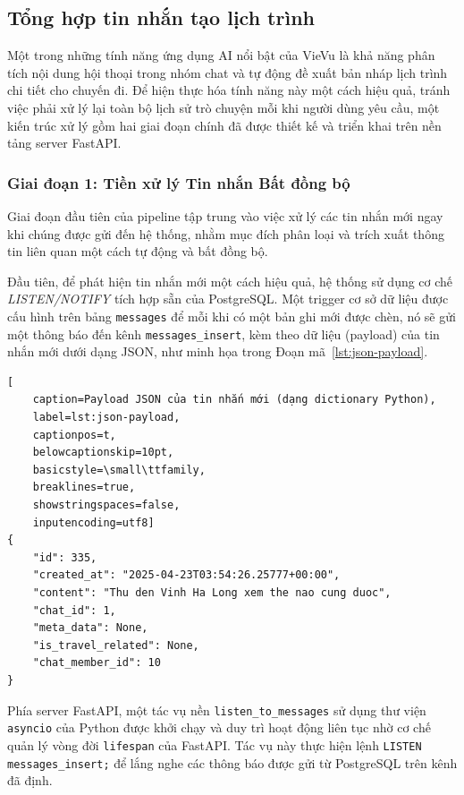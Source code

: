 
\subsection{Tổng hợp tin nhắn tạo lịch trình}
\label{subsec:summary_implementation_revised} %

Một trong những tính năng ứng dụng AI nổi bật của VieVu là khả năng phân tích nội dung hội thoại trong nhóm chat và tự động đề xuất bản nháp lịch trình chi tiết cho chuyến đi. Để hiện thực hóa tính năng này một cách hiệu quả, tránh việc phải xử lý lại toàn bộ lịch sử trò chuyện mỗi khi người dùng yêu cầu, một kiến trúc xử lý gồm hai giai đoạn chính đã được thiết kế và triển khai trên nền tảng server FastAPI.

\subsubsection{Giai đoạn 1: Tiền xử lý Tin nhắn Bất đồng bộ}
\label{subsubsec:summary_phase1_revised}

Giai đoạn đầu tiên của pipeline tập trung vào việc xử lý các tin nhắn mới ngay khi chúng được gửi đến hệ thống, nhằm mục đích phân loại và trích xuất thông tin liên quan một cách tự động và bất đồng bộ.

Đầu tiên, để phát hiện tin nhắn mới một cách hiệu quả, hệ thống sử dụng cơ chế \textit{LISTEN/NOTIFY} tích hợp sẵn của PostgreSQL. Một trigger cơ sở dữ liệu được cấu hình trên bảng \texttt{messages} để mỗi khi có một bản ghi mới được chèn, nó sẽ gửi một thông báo đến kênh \texttt{messages\_insert}, kèm theo dữ liệu (payload) của tin nhắn mới dưới dạng JSON, như minh họa trong Đoạn mã~\ref{lst:json-payload}. %

\lstset{language=json}
\begin{lstlisting}[
    caption=Payload JSON của tin nhắn mới (dạng dictionary Python),
    label=lst:json-payload,
    captionpos=t,
    belowcaptionskip=10pt,
    basicstyle=\small\ttfamily,
    breaklines=true,
    showstringspaces=false,
    inputencoding=utf8]
{
    "id": 335,
    "created_at": "2025-04-23T03:54:26.25777+00:00",
    "content": "Thu den Vinh Ha Long xem the nao cung duoc",
    "chat_id": 1,
    "meta_data": None,
    "is_travel_related": None,
    "chat_member_id": 10
}
\end{lstlisting}

\noindent Phía server FastAPI, một tác vụ nền \texttt{listen\_to\_messages} sử dụng thư viện \texttt{asyncio} của Python được khởi chạy và duy trì hoạt động liên tục nhờ cơ chế quản lý vòng đời \texttt{lifespan} của FastAPI. Tác vụ này thực hiện lệnh \texttt{LISTEN messages\_insert;} để lắng nghe các thông báo được gửi từ PostgreSQL trên kênh đã định. %


